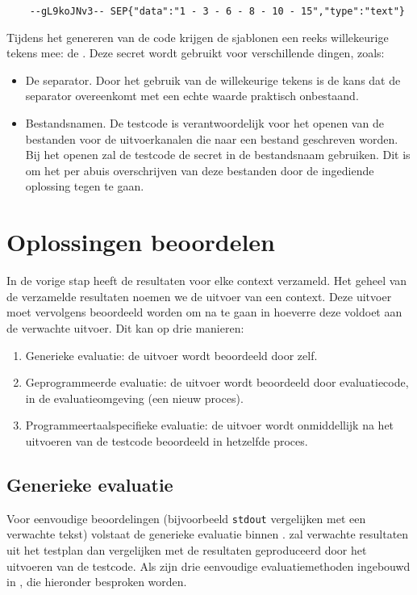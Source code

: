 \begin{verbatim}
    --gL9koJNv3-- SEP{"data":"1 - 3 - 6 - 8 - 10 - 15","type":"text"}
\end{verbatim}

Tijdens het genereren van de code krijgen de sjablonen een reeks willekeurige tekens mee: de .
Deze secret wordt gebruikt voor verschillende dingen, zoals:
\begin{itemize}
    \item De separator.
    Door het gebruik van de willekeurige tekens is de kans dat de separator overeenkomt met een echte waarde praktisch onbestaand.
    \item Bestandsnamen.
    De testcode is verantwoordelijk voor het openen van de bestanden voor de uitvoerkanalen die naar een bestand geschreven worden.
    Bij het openen zal de testcode de secret in de bestandsnaam gebruiken.
    Dit is om het per abuis overschrijven van deze bestanden door de ingediende oplossing tegen te gaan.
\end{itemize}

\section{Oplossingen beoordelen}\label{sec:oplossingen-beoordelen}

In de vorige stap heeft \tested{} de resultaten voor elke context verzameld.
Het geheel van de verzamelde resultaten noemen we de uitvoer van een context.
Deze uitvoer moet vervolgens beoordeeld worden om na te gaan in hoeverre deze voldoet aan de verwachte uitvoer.
Dit kan op drie manieren:
\begin{enumerate}
    \item Generieke evaluatie: de uitvoer wordt beoordeeld door \tested{} zelf.
    \item Geprogrammeerde evaluatie: de uitvoer wordt beoordeeld door evaluatiecode, in de evaluatieomgeving (een nieuw proces).
    \item Programmeertaalspecifieke evaluatie: de uitvoer wordt onmiddellijk na het uitvoeren van de testcode beoordeeld in hetzelfde proces.
\end{enumerate}

\subsection{Generieke evaluatie}\label{subsec:ingebouwde-evaluator}

Voor eenvoudige beoordelingen (bijvoorbeeld \texttt{stdout} vergelijken met een verwachte tekst) volstaat de generieke evaluatie binnen \tested{}.
\tested{} zal verwachte resultaten uit het testplan dan vergelijken met de resultaten geproduceerd door het uitvoeren van de testcode.
Als  zijn drie eenvoudige evaluatiemethoden ingebouwd in \tested{}, die hieronder besproken worden.

